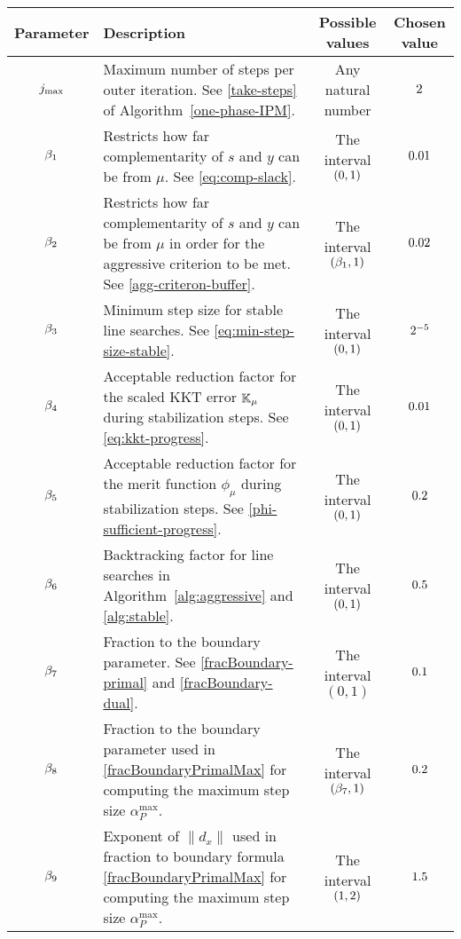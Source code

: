 \documentclass{article}
\begin{document}
\begin{table}[H]
\begin{tabular}{ |c| p{7cm}|c|c| } 
 \hline
Parameter & Description & Possible values & Chosen value  \\ 
 \hline
$j_{\max}$ & Maximum number of steps per outer iteration. See \eqref{take-steps} of Algorithm~\ref{one-phase-IPM}.  & Any natural number & $2$  \\ 
 \hline
  $\beta_{1}$ & Restricts how far complementarity of $s$ and $y$ can be from $\mu$. See \eqref{eq:comp-slack}.  & The interval $(0,1)$ & $0.01$ \\ 
 \hline
   $\beta_{2}$ & Restricts how far complementarity of $s$ and $y$ can be from $\mu$ in order for the aggressive criterion to be met. See \eqref{agg-criteron-buffer}.  & The interval  $(\beta_{1},1)$ & $0.02$  \\ 
    \hline
   $\beta_{3}$ & Minimum step size for stable line searches. See \eqref{eq:min-step-size-stable}.  & The interval $(0,1)$ & $2^{-5}$  \\ 
   \hline 
      $\beta_{4}$ & Acceptable reduction factor for the scaled KKT error $\mathbb{K}_{\mu}$ during stabilization steps. See \eqref{eq:kkt-progress}.  & The interval $(0,1)$ & $0.01$ \\ 
      \hline
            $\beta_{5}$ & Acceptable reduction factor for the merit function $\phi_{\mu}$ during stabilization steps. See \eqref{phi-sufficient-progress}.  & The interval $(0,1)$ & $0.2$  \\
    \hline
    $\beta_{6}$ & Backtracking factor for line searches in Algorithm~\ref{alg:aggressive} and \ref{alg:stable}. & The interval $(0,1)$ & $0.5$ \\
\hline
 $\beta_{7}$ & Fraction to the boundary parameter. See \eqref{fracBoundary-primal} and \eqref{fracBoundary-dual}. & The interval $(0,1)$ & $0.1$ \\ 
        \hline
$\beta_{8}$ & Fraction to the boundary parameter used in \eqref{fracBoundaryPrimalMax} for computing the maximum step size $\alpha_{P}^{\max}$. & The interval $(\beta_{7},1)$ & $0.2$ \\
\hline
$\beta_{9}$ & Exponent of $\| d_{x} \|$ used in fraction to boundary formula \eqref{fracBoundaryPrimalMax} for computing the maximum step size $\alpha_{P}^{\max}$. & The interval $(1,2)$ & $1.5$ \\

\end{tabular}
\end{table}
\end{document}
